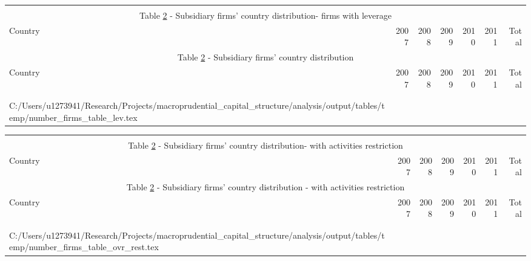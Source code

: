 \documentclass[12pt]{article}
\makeatletter
\newcommand\primitiveinput[1]
{\@@input #1 }
\makeatother
\begin{document}
	

	\begin{small}
	{
		\begin{longtable}{lrrrrrr}\\
			\label{tab:number of firms}\\
			\multicolumn{7}{c}{Table \ref{tab:number of firms} - Subsidiary firms' country distribution- firms with leverage}\\
			\hline \hline \addlinespace Country & 2007 & 2008 & 2009 & 2010 & 2011 & Total  \\
			\endfirsthead
			\multicolumn{7}{c}{Table \ref{tab:number of firms} - Subsidiary firms' country distribution}\\
			\hline \hline \addlinespace Country & 2007 & 2008 & 2009 & 2010 & 2011 & Total  \\
			\hline \addlinespace \endhead
			\hline
			\multicolumn{7}{r}{{\textit{(Continued)}}}\\ \endfoot
			\\ 	
			\endlastfoot
			\primitiveinput{C:/Users/u1273941/Research/Projects/macroprudential_capital_structure/analysis/output/tables/temp/number_firms_table_lev.tex}
			\hline 			
		\end{longtable}	
	}
\end{small}

	\begin{small}
	{
		\begin{longtable}{lrrrrrr}\\
			\label{tab:number of firms}\\
			\multicolumn{7}{c}{Table \ref{tab:number of firms} - Subsidiary firms' country distribution- with activities restriction}\\
			\hline \hline \addlinespace Country & 2007 & 2008 & 2009 & 2010 & 2011 & Total  \\
			\endfirsthead
			\multicolumn{7}{c}{Table \ref{tab:number of firms} - Subsidiary firms' country distribution - with activities restriction}\\
			\hline \hline \addlinespace Country & 2007 & 2008 & 2009 & 2010 & 2011 & Total  \\
			\hline \addlinespace \endhead
			\hline
			\multicolumn{7}{r}{{\textit{(Continued)}}}\\ \endfoot
			\\ 	
			\endlastfoot
			\primitiveinput{C:/Users/u1273941/Research/Projects/macroprudential_capital_structure/analysis/output/tables/temp/number_firms_table_ovr_rest.tex}
			\hline 			
		\end{longtable}	
	}
\end{small}
\end{document}
